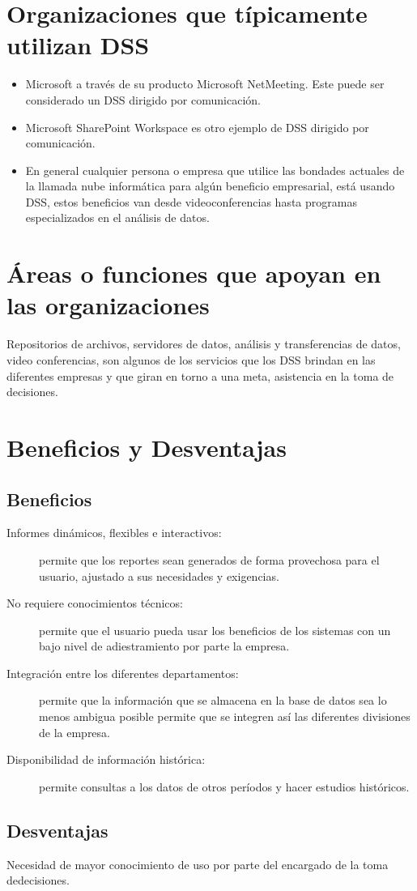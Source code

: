 \section {Organizaciones que típicamente utilizan DSS}
\begin{itemize}
\item Microsoft a través de su producto Microsoft NetMeeting. Este puede ser considerado un DSS dirigido por comunicación.
\item Microsoft SharePoint Workspace es otro ejemplo de DSS dirigido por comunicación.
\item En general cualquier persona o empresa que utilice las bondades actuales  de la llamada nube informática para algún beneficio empresarial, está  usando DSS, estos beneficios van desde videoconferencias hasta programas especializados en el análisis de datos.
\end{itemize}

\section {Áreas o funciones que apoyan en las organizaciones}
Repositorios de archivos, servidores de datos, análisis y transferencias de datos, video conferencias, son algunos de los servicios que los DSS brindan en las diferentes empresas y que giran en torno a una meta, asistencia en la toma de decisiones.

\section {Beneficios y Desventajas}

\subsection{Beneficios}
\begin{description}
\item [Informes dinámicos, flexibles e interactivos:] permite que los reportes sean generados de forma provechosa para el usuario, ajustado a sus necesidades y exigencias.
\item [No requiere conocimientos técnicos:] permite que el usuario pueda usar los beneficios de los sistemas con un bajo nivel de adiestramiento por parte la empresa.
\item [Integración entre los diferentes departamentos:] permite que la información que se almacena en la base de datos sea lo menos ambigua posible permite que se integren así las diferentes divisiones de la empresa.
\item [Disponibilidad de información histórica:] permite consultas a los datos de otros períodos y hacer estudios históricos.
\end{description}

\subsection{Desventajas}
\begin{description}
\item Necesidad de mayor conocimiento de uso por parte del encargado de la toma dedecisiones.
\end{description}

